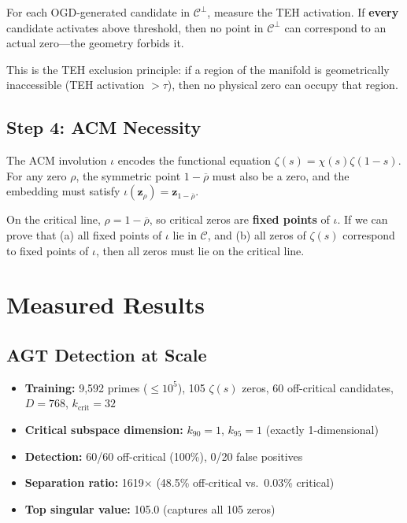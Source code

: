\documentclass{article}
\begin{document}
For each OGD-generated candidate in $\mathcal{C}^\perp$, measure the TEH
activation.  If \textbf{every} candidate activates above threshold, then
no point in $\mathcal{C}^\perp$ can correspond to an actual zero---the
geometry forbids it.

This is the TEH exclusion principle: if a region of the manifold is
geometrically inaccessible (TEH activation $> \tau$), then no physical
zero can occupy that region.

\subsection{Step 4: ACM Necessity}

The ACM involution $\iota$ encodes the functional equation
$\zeta(s) = \chi(s)\zeta(1-s)$.  For any zero $\rho$, the symmetric
point $1 - \overline{\rho}$ must also be a zero, and the embedding
must satisfy $\iota(\mathbf{z}_\rho) = \mathbf{z}_{1-\overline{\rho}}$.

On the critical line, $\rho = 1 - \overline{\rho}$, so critical zeros are
\textbf{fixed points} of $\iota$.  If we can prove that (a) all fixed points
of $\iota$ lie in $\mathcal{C}$, and (b) all zeros of $\zeta(s)$ correspond
to fixed points of $\iota$, then all zeros must lie on the critical line.

\section{Measured Results}
\label{sec:results}

\subsection{AGT Detection at Scale}

\begin{itemize}
  \item \textbf{Training:} 9,592 primes ($\leq 10^5$), 105 $\zeta(s)$ zeros,
    60 off-critical candidates, $D=768$, $k_{\mathrm{crit}}=32$
  \item \textbf{Critical subspace dimension:} $k_{90}=1$, $k_{95}=1$ (exactly
    1-dimensional)
  \item \textbf{Detection:} 60/60 off-critical (100\%), 0/20 false positives
  \item \textbf{Separation ratio:} 1619$\times$ (48.5\% off-critical vs.\
    0.03\% critical)
  \item \textbf{Top singular value:} 105.0 (captures all 105 zeros)
\end{itemize}
\end{document}
